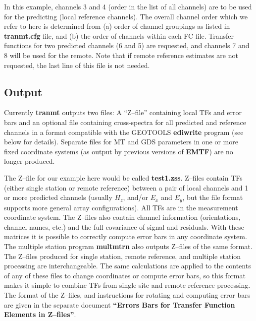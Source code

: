 In this example, channels 3 and 4 (order in the list of all channels)
are to be used for the predicting (local reference channels).
The overall channel order which we refer to here is
determined from (a) order of channel groupings as listed
in {\bf tranmt.cfg} file, and (b) the order of channels within each FC file.
Transfer functions for two predicted channels (6 and 5) are requested,
and channels 7 and 8 will be used for the remote.
Note that if remote reference estimates are not requested, the last
line of this file is not needed.

\subsection{Output}

Currently {\bf tranmt} outputs two files: A ``Z--file'' containing local
TFs and error bars and an optional file containing cross-spectra for
all predicted and reference channels in a format compatible with the
GEOTOOLS {\bf ediwrite} program (see below for details).
Separate files for MT and GDS parameters in one or more fixed coordinate
systems (as output by previous versions of {\bf EMTF})
are no longer produced.

The Z--file for our example here would be called {\bf test1.zss}. 
Z--files contain
TFs (either single station or remote reference) between a pair
of local channels and 1 or more predicted channels (usually $H_z$, and/or
$E_x$ and $E_y$, but the file format supports more general array
configurations).  All TFs are in the measurement
coordinate system.  The Z--files also contain channel information
(orientations, channel names, etc.) and the full covariance of signal
and residuals.  With these matrices it is possible to correctly
compute error bars in any coordinate system.  The multiple station
program {\bf multmtrn} also outputs Z--files of the same format.
The Z--files produced for single station, remote reference, and 
multiple station processing are interchangeable.  The same calculations
are applied to the contents of any of these files to change coordinates
or compute error bars, so this format makes it simple to
combine TFs from single site and remote reference processing.
The format of the Z--files, and instructions for
rotating and computing error bars are given in the separate document
{\bf ``Errors Bars for Transfer Function Elements in Z--files''}.

